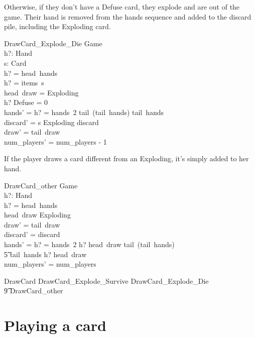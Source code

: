 \documentclass[11pt, fuzz]{article}
\begin{document}
Otherwise, if they don't have a Defuse card, they explode and are out of the game. Their hand is removed from the hands sequence and added to the discard pile, including the Exploding card. 

\begin{schema}{DrawCard\_Explode\_Die}
    \Delta Game \\
    h?: Hand \\
    s: \seq Card \\
\where
    h? = head~hands \\
    h? = items~s \\
    head~draw = Exploding \\
    h? \bcount Defuse = 0 \\
    hands' = \IF h? = hands~2 \THEN tail~(tail~hands) \ELSE tail~hands \\
    discard' = s \cat \langle Exploding \rangle \cat discard \\
    draw' = tail~draw \\
    num\_players' = num\_players - 1
\end{schema}

If the player draws a card different from an Exploding, it's simply added to her hand. 

\begin{schema}{DrawCard\_other}
    \Delta Game \\
    h?: Hand \\
\where
    h? = head~hands \\
    head~draw \neq Exploding \\
    draw' = tail~draw \\
    discard' = discard \\
    hands' = \IF h? = hands~2 \THEN \langle h? \uplus \lbag head~draw \rbag \rangle \cat tail~(tail~hands)\\ \t5 \ELSE tail~hands \cat \langle h? \uplus \lbag head~draw \rbag \rangle \\
    num\_players' = num\_players
\end{schema}

\begin{zed}
    DrawCard  DrawCard\_Explode\_Survive \lor DrawCard\_Explode\_Die\\ \t9 \lor DrawCard\_other 
\end{zed}


\section{Playing a card}
\end{document}
